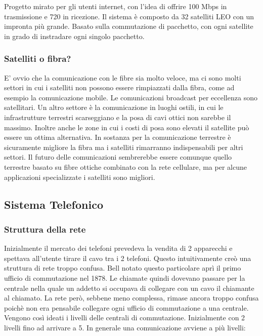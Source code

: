 Progetto mirato per gli utenti internet, con l'idea di offrire 100 Mbps in trasmissione e 720 in ricezione. Il sistema è composto da 32 satelliti LEO con un impronta più grande. Basato sulla commutazione di pacchetto, con ogni satellite in grado di instradare ogni singolo pacchetto.

\subsubsection{Satelliti o fibra?}

E' ovvio che la comunicazione con le fibre sia molto veloce, ma ci sono molti settori in cui i satelliti non possono essere rimpiazzati dalla fibra, come ad esempio la comunicazione mobile. Le comunicazioni broadcast per eccellenza sono satellitari. Un altro settore è la comunicazione in luoghi ostili, in cui le infrastrutture terrestri scarseggiano e la posa di cavi ottici non sarebbe il massimo. Inoltre anche le zone in cui i costi di posa sono elevati il satellite può essere un ottima alternativa. In sostanza per la comunicazione terrestre è sicuramente migliore la fibra ma i satelliti rimarranno indispensabili per altri settori. Il futuro delle comunicazioni sembrerebbe essere comunque quello terrestre basato su fibre ottiche combinato con la rete cellulare, ma per alcune applicazioni specializzate i satelliti sono migliori.

\subsection{Sistema Telefonico}

\subsubsection{Struttura della rete}

Inizialmente il mercato dei telefoni prevedeva la vendita di 2 apparecchi e spettava all'utente tirare il cavo tra i 2 telefoni. Questo intuitivamente creò una struttura di rete troppo confusa. Bell notato questo particolare aprì il primo ufficio di commutazione nel 1878. Le chiamate quindi dovevano passare per la centrale nella quale un addetto si occupava di collegare con un cavo il chiamante al chiamato. La rete però, sebbene meno complessa, rimase ancora troppo confusa poichè non era pensabile collegare ogni ufficio di commutazione a una centrale. Vengono così ideati i livelli delle centrali di commutazione. Inizialmente con 2 livelli fino ad arrivare a 5. In generale una comunicazione avviene a più livelli:

